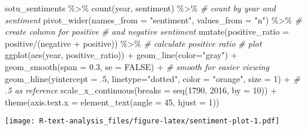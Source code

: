 \documentclass[
]{book}
\newenvironment{Shaded}{\begin{snugshade}}{\end{snugshade}}
\newcommand{\AttributeTok}[1]{\textcolor[rgb]{0.77,0.63,0.00}{#1}}
\newcommand{\CommentTok}[1]{\textcolor[rgb]{0.56,0.35,0.01}{\textit{#1}}}
\newcommand{\ConstantTok}[1]{\textcolor[rgb]{0.00,0.00,0.00}{#1}}
\newcommand{\DecValTok}[1]{\textcolor[rgb]{0.00,0.00,0.81}{#1}}
\newcommand{\FloatTok}[1]{\textcolor[rgb]{0.00,0.00,0.81}{#1}}
\newcommand{\FunctionTok}[1]{\textcolor[rgb]{0.00,0.00,0.00}{#1}}
\newcommand{\NormalTok}[1]{#1}
\newcommand{\SpecialCharTok}[1]{\textcolor[rgb]{0.00,0.00,0.00}{#1}}
\newcommand{\StringTok}[1]{\textcolor[rgb]{0.31,0.60,0.02}{#1}}
\begin{document}
\begin{Shaded}
\begin{Highlighting}[]
\NormalTok{sotu\_sentiments }\SpecialCharTok{\%\textgreater{}\%} 
  \FunctionTok{count}\NormalTok{(year, sentiment) }\SpecialCharTok{\%\textgreater{}\%} \CommentTok{\# count by year and sentiment}
  \FunctionTok{pivot\_wider}\NormalTok{(}\AttributeTok{names\_from =} \StringTok{"sentiment"}\NormalTok{, }\AttributeTok{values\_from =} \StringTok{"n"}\NormalTok{) }\SpecialCharTok{\%\textgreater{}\%} \CommentTok{\# create column for positive}
                                                               \CommentTok{\# and negative sentiment}
  \FunctionTok{mutate}\NormalTok{(}\AttributeTok{positive\_ratio =}\NormalTok{ positive}\SpecialCharTok{/}\NormalTok{(negative }\SpecialCharTok{+}\NormalTok{ positive)) }\SpecialCharTok{\%\textgreater{}\%} \CommentTok{\# calculate positive ratio}
  \CommentTok{\# plot}
  \FunctionTok{ggplot}\NormalTok{(}\FunctionTok{aes}\NormalTok{(year, positive\_ratio)) }\SpecialCharTok{+}
    \FunctionTok{geom\_line}\NormalTok{(}\AttributeTok{color=}\StringTok{"gray"}\NormalTok{) }\SpecialCharTok{+}
    \FunctionTok{geom\_smooth}\NormalTok{(}\AttributeTok{span =} \FloatTok{0.3}\NormalTok{, }\AttributeTok{se =} \ConstantTok{FALSE}\NormalTok{) }\SpecialCharTok{+} \CommentTok{\# smooth for easier viewing}
    \FunctionTok{geom\_hline}\NormalTok{(}\AttributeTok{yintercept =}\NormalTok{ .}\DecValTok{5}\NormalTok{, }\AttributeTok{linetype=}\StringTok{"dotted"}\NormalTok{, }\AttributeTok{color =} \StringTok{"orange"}\NormalTok{, }\AttributeTok{size =} \DecValTok{1}\NormalTok{) }\SpecialCharTok{+} \CommentTok{\# .5 as reference}
    \FunctionTok{scale\_x\_continuous}\NormalTok{(}\AttributeTok{breaks =} \FunctionTok{seq}\NormalTok{(}\DecValTok{1790}\NormalTok{, }\DecValTok{2016}\NormalTok{, }\AttributeTok{by =} \DecValTok{10}\NormalTok{)) }\SpecialCharTok{+}
    \FunctionTok{theme}\NormalTok{(}\AttributeTok{axis.text.x =} \FunctionTok{element\_text}\NormalTok{(}\AttributeTok{angle =} \DecValTok{45}\NormalTok{, }\AttributeTok{hjust =} \DecValTok{1}\NormalTok{))}
\end{Highlighting}
\end{Shaded}

\texttt{[image: R-text-analysis\_files/figure-latex/sentiment-plot-1.pdf]}

  
\end{document}
